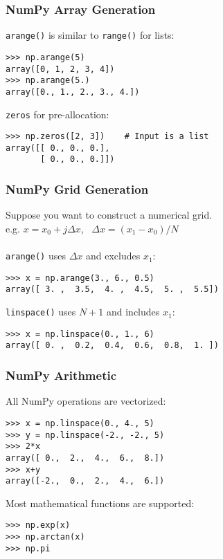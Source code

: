 \begin{frame}[fragile]
    \frametitle{NumPy Array Generation}

    \lstinline|arange()| is similar to \lstinline|range()| for lists:
    \begin{lstlisting}
>>> np.arange(5)
array([0, 1, 2, 3, 4])
>>> np.arange(5.)
array([0., 1., 2., 3., 4.])
    \end{lstlisting}
    
    \lstinline|zeros| for pre-allocation:
    \begin{lstlisting}
>>> np.zeros([2, 3])    # Input is a list
array([[ 0., 0., 0.],
       [ 0., 0., 0.]])
    \end{lstlisting}
\end{frame}

\begin{frame}[fragile]
    \frametitle{NumPy Grid Generation}
   
    Suppose you want to construct a numerical grid.\\
    e.g. $x = x_0 + j \Delta x$, \ $\Delta x = (x_1 - x_0) / N$
    \\~\\
    \lstinline|arange()| uses $\Delta x$ and excludes $x_1$:
    \begin{lstlisting}
>>> x = np.arange(3., 6., 0.5)
array([ 3. ,  3.5,  4. ,  4.5,  5. ,  5.5])
    \end{lstlisting}
    \lstinline|linspace()| uses $N+1$ and includes $x_1$:
    \begin{lstlisting}
>>> x = np.linspace(0., 1., 6)
array([ 0. ,  0.2,  0.4,  0.6,  0.8,  1. ])
    \end{lstlisting}
\end{frame}

\begin{frame}[fragile]
    \frametitle{NumPy Arithmetic}
    
    All NumPy operations are vectorized:
    \begin{lstlisting}
>>> x = np.linspace(0., 4., 5)
>>> y = np.linspace(-2., -2., 5)
>>> 2*x
array([ 0.,  2.,  4.,  6.,  8.])
>>> x+y
array([-2.,  0.,  2.,  4.,  6.])
    \end{lstlisting}

    Most mathematical functions are supported:
    \begin{lstlisting}
>>> np.exp(x)
>>> np.arctan(x)
>>> np.pi
    \end{lstlisting}
\end{frame}

